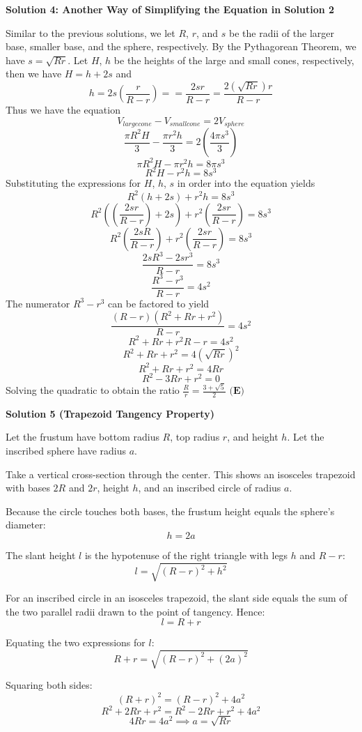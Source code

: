 \begin{enumerate}
 



\textbf{Solution 4: Another Way of Simplifying the Equation in Solution 2}

Similar to the previous solutions, we let $R$, $r$, and $s$ be the radii of the larger base, smaller base, and the sphere, respectively. By the Pythagorean Theorem, we have $s=\sqrt{Rr}$. Let $H$, $h$ be the heights of the large and small cones, respectively, then we have $H=h+2s$ and
 \[h=2s\left(\frac{r}{R-r}\right)==\frac{2sr}{R-r}=\frac{2\left(\sqrt{Rr}\right)r}{R-r}\] Thus we have the equation 
 \[V_{large cone}-V_{small cone}=2V_{sphere}\]
 \[\frac{\pi R^2H}{3}-\frac{\pi r^2h}{3}=2\left(\frac{4\pi s^3}{3}\right)\]
 \[\pi R^2H-\pi r^2h=8\pi s^3\]
 \[R^2H-r^2h=8s^3\]Substituting the expressions for $H$, $h$, $s$ in order into the equation yields
 \[R^2\left(h+2s\right)+r^2h=8s^3\]
 \[R^2\left(\left(\frac{2sr}{R-r}\right)+2s\right)+r^2\left(\frac{2sr}{R-r}\right)=8s^3\]
 \[R^2\left(\frac{2sR}{R-r}\right)+r^2\left(\frac{2sr}{R-r}\right)=8s^3\]
 \[\frac{2sR^3-2sr^3}{R-r}=8s^3\]
 \[\frac{R^3-r^3}{R-r}=4s^2\]The numerator $R^3-r^3$ can be factored to yield
 \[\frac{\left(R-r\right)\left(R^2+Rr+r^2\right)}{R-r}=4s^2\]
 \[R^2+Rr+r^2{R-r}=4s^2\]
 \[R^2+Rr+r^2=4\left(\sqrt{Rr}\right)^2\]
 \[R^2+Rr+r^2=4Rr\]
 \[R^2-3Rr+r^2=0\]Solving the quadratic to obtain the ratio $\frac{R}{r}=\frac{3+\sqrt{5}}{2}$ $\boxed{\textbf{(E)}}$




\textbf{Solution 5 (Trapezoid Tangency Property)}

Let the frustum have bottom radius $R$, top radius $r$, and height $h$. Let the inscribed sphere have radius $a$.

 Take a vertical cross-section through the center. This shows an isosceles trapezoid with bases $2R$ and $2r$, height $h$, and an inscribed circle of radius $a$.

 Because the circle touches both bases, the frustum height equals the sphere’s diameter:
 \[h = 2a\]

 The slant height $l$ is the hypotenuse of the right triangle with legs $h$ and $R - r$:
 \[l = \sqrt{(R - r)^2 + h^2}\]

 For an inscribed circle in an isosceles trapezoid, the slant side equals the sum of the two parallel radii drawn to the point of tangency. Hence:
 \[l = R + r\]

 Equating the two expressions for $l$:
 \[R + r = \sqrt{(R - r)^2 + (2a)^2}\]

 Squaring both sides:
 \[(R + r)^2 = (R - r)^2 + 4a^2\]
 \[R^2 + 2Rr + r^2 = R^2 - 2Rr + r^2 + 4a^2\]
 \[4Rr = 4a^2 \implies a = \sqrt{Rr}\]


\end{enumerate}
